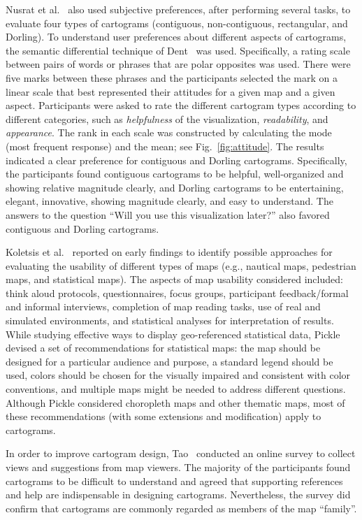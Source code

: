 \documentclass{egpubl}
\begin{document}
Nusrat et al.~\cite{NusratAK15} also used subjective preferences, after performing several tasks, to evaluate four types of cartograms (contiguous, non-contiguous, rectangular, and Dorling). 
To understand user preferences about different aspects of cartograms, the semantic differential technique of Dent~\cite{dent1975} was used. Specifically, a rating scale between pairs of words or phrases that are polar opposites was used. There were five marks between these phrases and the participants selected the mark on a linear scale that best represented their attitudes for a given map and a given aspect. 
Participants were asked to rate the different cartogram types according to different categories, such as {\em helpfulness} of the visualization, {\em readability}, and {\em appearance}. The rank in each scale was constructed by calculating the mode (most frequent response) and the mean; see Fig.~\ref{fig:attitude}. The results indicated a clear preference for contiguous and Dorling cartograms. Specifically, the participants found contiguous cartograms to be helpful, well-organized and showing relative magnitude clearly, and Dorling cartograms to be entertaining, elegant, innovative, showing magnitude clearly, and easy to understand. The answers to the question ``Will you use this visualization later?'' also favored contiguous and Dorling cartograms.



Koletsis et al.~\cite{koletsis2014identifying} reported on early findings to identify possible approaches for evaluating the usability of different types of maps (e.g., nautical maps, pedestrian maps, and statistical maps). The aspects of map usability considered included: 
think aloud protocols, questionnaires, focus groups, participant feedback/formal and informal interviews, completion of map reading tasks, use of real and simulated environments, and statistical analyses for interpretation of results.
While studying effective ways to display geo-referenced statistical data, Pickle~\cite{pickle2003usability} devised a set of recommendations for statistical maps: the map should be designed for a particular audience and purpose, a standard legend should be used, colors should be chosen for the visually impaired and consistent with color conventions, and
multiple maps might be needed to address different questions. Although  Pickle considered choropleth maps and other thematic maps, most of these recommendations (with some extensions and modification) apply to cartograms.  

In order to improve cartogram design, Tao~\cite{Manting} conducted an online survey to collect views and suggestions from map viewers. The majority of the participants found cartograms to be difficult to understand and agreed that supporting references and help are indispensable in designing cartograms. Nevertheless, the survey did confirm that
 cartograms are commonly regarded as members of the map ``family''.
\end{document}

